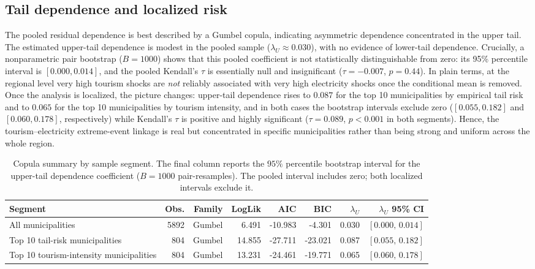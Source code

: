 \documentclass[11pt,a4paper]{article}
\begin{document}
\subsection{Tail dependence and localized risk}

The pooled residual dependence is best described by a Gumbel copula, indicating asymmetric dependence concentrated in the upper tail. The estimated upper-tail dependence is modest in the pooled sample ($\lambda_U \approx 0.030$), with no evidence of lower-tail dependence. Crucially, a nonparametric pair bootstrap ($B=1000$) shows that this pooled coefficient is not statistically distinguishable from zero: its 95\% percentile interval is $[0.000, 0.014]$, and the pooled Kendall's $\tau$ is essentially null and insignificant ($\tau=-0.007$, $p=0.44$). In plain terms, at the regional level very high tourism shocks are \emph{not} reliably associated with very high electricity shocks once the conditional mean is removed. Once the analysis is localized, the picture changes: upper-tail dependence rises to $0.087$ for the top 10 municipalities by empirical tail risk and to $0.065$ for the top 10 municipalities by tourism intensity, and in both cases the bootstrap intervals exclude zero ($[0.055, 0.182]$ and $[0.060, 0.178]$, respectively) while Kendall's $\tau$ is positive and highly significant ($\tau=0.089$, $p<0.001$ in both segments). Hence, the tourism--electricity extreme-event linkage is real but concentrated in specific municipalities rather than being strong and uniform across the whole region.

\begin{table}[H]
\centering
\caption{Copula summary by sample segment. The final column reports the $95\%$ percentile bootstrap interval for the upper-tail dependence coefficient ($B=1000$ pair-resamples). The pooled interval includes zero; both localized intervals exclude it.}
\label{tab:copula-segments}
\begin{tabular}{lrrrrrrr}
\toprule
Segment & Obs. & Family & LogLik & AIC & BIC & $\lambda_U$ & $\lambda_U$ 95\% CI \\
\midrule
All municipalities & 5892 & Gumbel & 6.491 & -10.983 & -4.301 & 0.030 & $[0.000,\,0.014]$ \\
Top 10 tail-risk municipalities & 804 & Gumbel & 14.855 & -27.711 & -23.021 & 0.087 & $[0.055,\,0.182]$ \\
Top 10 tourism-intensity municipalities & 804 & Gumbel & 13.231 & -24.461 & -19.771 & 0.065 & $[0.060,\,0.178]$ \\
\bottomrule
\end{tabular}
\end{table}
\end{document}
